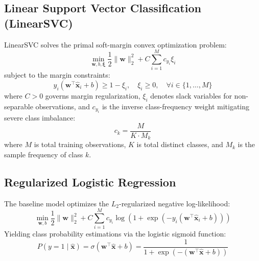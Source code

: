 \documentclass[conference]{IEEEtran}
\begin{document}
\subsection{Linear Support Vector Classification (LinearSVC)}
LinearSVC solves the primal soft-margin convex optimization problem:
\begin{equation}
    \min_{\mathbf{w}, b, \boldsymbol{\xi}} \frac{1}{2} \|\mathbf{w}\|_2^2 + C \sum_{i=1}^{M} c_{y_i} \xi_i
\end{equation}
subject to the margin constraints:
\begin{equation}
    y_i (\mathbf{w}^\top \hat{\mathbf{x}}_i + b) \ge 1 - \xi_i, \quad \xi_i \ge 0, \quad \forall i \in \{1, \dots, M\}
\end{equation}
where $C > 0$ governs margin regularization, $\xi_i$ denotes slack variables for non-separable observations, and $c_{y_i}$ is the inverse class-frequency weight mitigating severe class imbalance:
\begin{equation}
    c_k = \frac{M}{K \cdot M_k}
\end{equation}
where $M$ is total training observations, $K$ is total distinct classes, and $M_k$ is the sample frequency of class $k$.

\subsection{Regularized Logistic Regression}
The baseline model optimizes the $L_2$-regularized negative log-likelihood:
\begin{equation}
    \min_{\mathbf{w}, b} \frac{1}{2} \|\mathbf{w}\|_2^2 + C \sum_{i=1}^{M} c_{y_i} \log\left(1 + \exp\left(-y_i (\mathbf{w}^\top \hat{\mathbf{x}}_i + b)\right)\right)
\end{equation}
Yielding class probability estimations via the logistic sigmoid function:
\begin{equation}
    P(y = 1 \mid \hat{\mathbf{x}}) = \sigma(\mathbf{w}^\top \hat{\mathbf{x}} + b) = \frac{1}{1 + \exp(-(\mathbf{w}^\top \hat{\mathbf{x}} + b))}
\end{equation}
\end{document}
